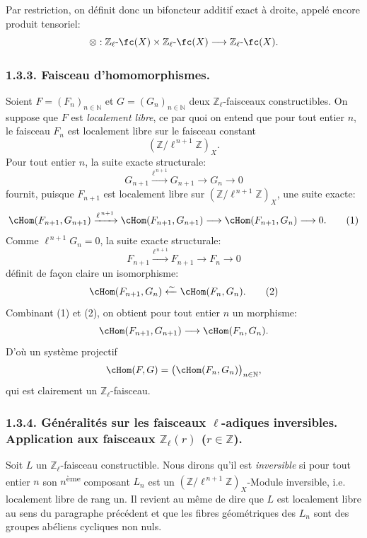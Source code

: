 Par restriction, on définit donc un bifoncteur additif exact à droite, appelé encore produit tensoriel:
\[
\otimes:\mathbb{Z}_\ell\text{-}\fc(X)\times \mathbb{Z}_\ell\text{-}\fc(X)
\longrightarrow \mathbb{Z}_\ell\text{-}\fc(X).
\]

\subsubsection*{1.3.3. Faisceau d'homomorphismes.}

Soient \(F=(F_n)_{n\in\mathbb{N}}\) et \(G=(G_n)_{n\in\mathbb{N}}\) deux \(\mathbb{Z}_\ell\)-faisceaux constructibles. On suppose que \(F\) est \emph{localement libre}, ce par quoi on entend que pour tout entier \(n\), le faisceau \(F_n\) est localement libre sur le faisceau constant
\[
(\mathbb{Z}/\ell^{\,n+1}\mathbb{Z})_X.
\]
Pour tout entier \(n\), la suite exacte structurale:
\[
G_{n+1}\xrightarrow{\ell^{\,n+1}}G_{n+1}\longrightarrow G_n\longrightarrow 0
\]
fournit, puisque \(F_{n+1}\) est localement libre sur \((\mathbb{Z}/\ell^{\,n+1}\mathbb{Z})_X\), une suite exacte:
\[
\cHom(F_{n+1},G_{n+1})
 \xrightarrow{\ell^{\,n+1}}
\cHom(F_{n+1},G_{n+1})
 \longrightarrow
\cHom(F_{n+1},G_n)
 \longrightarrow 0.
\tag{1}
\]
Comme \(\ell^{\,n+1}G_n=0\), la suite exacte structurale:
\[
F_{n+1}\xrightarrow{\ell^{\,n+1}}F_{n+1}\longrightarrow F_n\longrightarrow 0
\]
définit de façon claire un isomorphisme:
\[
\cHom(F_{n+1},G_n)\xleftarrow{\sim}\cHom(F_n,G_n).
\tag{2}
\]
Combinant (1) et (2), on obtient pour tout entier \(n\) un morphisme:
\[
\cHom(F_{n+1},G_{n+1})\longrightarrow \cHom(F_n,G_n).
\]
D'où un système projectif
\[
\cHom(F,G)=\bigl(\cHom(F_n,G_n)\bigr)_{n\in\mathbb{N}},
\]
qui est clairement un \(\mathbb{Z}_\ell\)-faisceau.

\subsubsection*{1.3.4. Généralités sur les faisceaux \(\ell\)-adiques inversibles. Application aux faisceaux \(\mathbb{Z}_\ell(r)\) (\(r\in\mathbb{Z}\)).}

Soit \(L\) un \(\mathbb{Z}_\ell\)-faisceau constructible. Nous dirons qu'il est \emph{inversible} si pour tout entier \(n\) son \(n\)\textsuperscript{ème} composant \(L_n\) est un \((\mathbb{Z}/\ell^{\,n+1}\mathbb{Z})_X\)-Module inversible, i.e. localement libre de rang un. Il revient au même de dire que \(L\) est localement libre au sens du paragraphe précédent et que les fibres géométriques des \(L_n\) sont des groupes abéliens cycliques non nuls.

